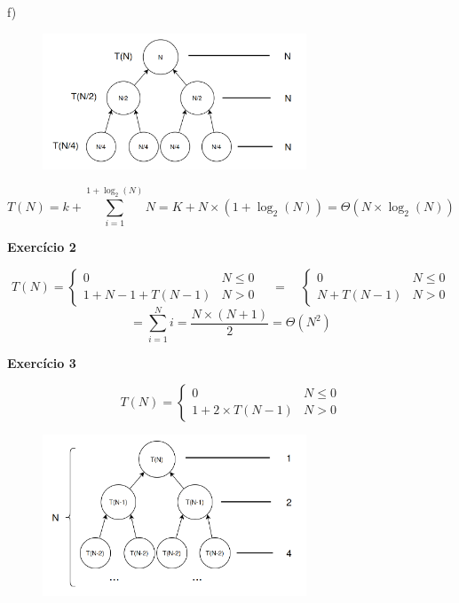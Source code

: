 \documentclass[a4paper,11pt]{article}
\begin{document}
	\noindent f)
	
	\begin{figure}[h]
		\centering
		\includegraphics[width=0.7\textwidth]{imgs/2_1-f}
		\label{fig:2_1-f}
	\end{figure}
	\[
		T(N) = k + \sum_{i=1}^{1 + \log_2(N)} N = K + N \times (1 + \log_2(N)) = \Theta(N \times \log_2(N))
	\]
	
	\noindent \textbf{Exercício 2}
	
	\[
		T(N) =
		\begin{cases}
			0 & N \leq 0 \\
			1 + N - 1 + T(N - 1) & N > 0
		\end{cases}
		\quad = \quad
		\begin{cases}
			0 & N \leq 0 \\
			N + T(N - 1) & N > 0
		\end{cases}
	\]
	\[
		= \sum_{i=1}^{N} i = \frac{N \times (N + 1)}{2} = \Theta(N^2)
	\]
	
	
	\noindent \textbf{Exercício 3}
	
	\[
		T(N) = 
		\begin{cases}
			0 & N \leq 0 \\
			1 + 2 \times T(N - 1) & N > 0
		\end{cases}
	\]
	
	\begin{figure}[h]
		\centering
		\includegraphics[width=0.7\textwidth]{imgs/2_3}
		\label{fig:2_3}
	\end{figure}
	
\end{document}
